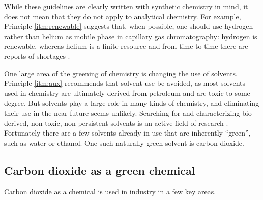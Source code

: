 While these guidelines are clearly written with synthetic chemistry in mind, it
does not mean that they do not apply to analytical chemistry. For example,
Principle \ref{itm:renewable} suggests that, when possible, one should use
hydrogen rather than helium as mobile phase in capillary gas chromatography:
hydrogen is renewable, whereas helium is a finite resource and from time-to-time
there are reports of shortages \autocite{Kornblut2019}.

One large area of the greening of chemistry is changing the use of solvents.
Principle \ref{itm:aux} recommends that solvent use be avoided, as most solvents
used in chemistry are ultimately derived from petroleum and are toxic to some
degree. But solvents play a large role in many kinds of chemistry, and
eliminating their use in the near future seems unlikely. Searching for and
characterizing bio-derived, non-toxic, non-persistent solvents is an active
field of research \autocite{Clarke2018}. Fortunately there are a few solvents
already in use that are inherently ``green'', such as water or ethanol. One such
naturally green solvent is carbon dioxide.
 

\subsection{Carbon dioxide as a green chemical}

Carbon dioxide as a chemical is used in industry in a few key areas.

